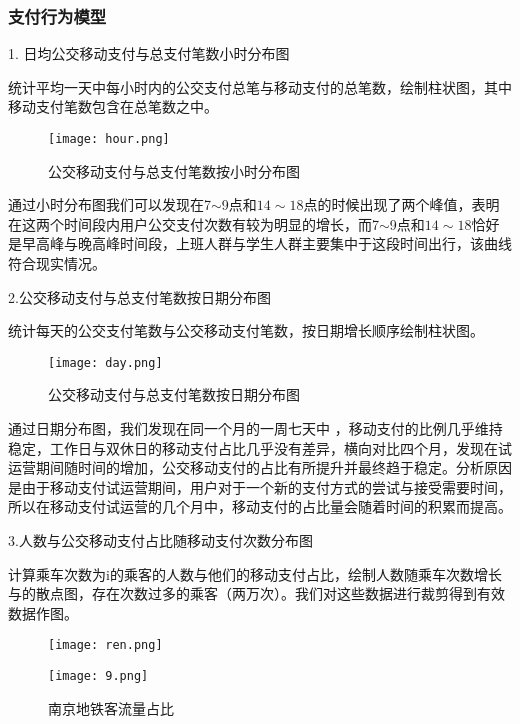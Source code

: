 \documentclass[withoutpreface,bwprint]{cumcmthesis} %
\begin{document}





\subsubsection{支付行为模型}

1. 日均公交移动支付与总支付笔数小时分布图

统计平均一天中每小时内的公交支付总笔与移动支付的总笔数，绘制柱状图，其中移动支付笔数包含在总笔数之中。
\begin{figure}[h]
\texttt{[image: hour.png]}
\caption{公交移动支付与总支付笔数按小时分布图}
\end{figure}

通过小时分布图我们可以发现在7$\sim$9点和$14\sim18$点的时候出现了两个峰值，表明在这两个时间段内用户公交支付次数有较为明显的增长，而7$\sim$9点和$14\sim18$恰好是早高峰与晚高峰时间段，上班人群与学生人群主要集中于这段时间出行，该曲线符合现实情况。

2.公交移动支付与总支付笔数按日期分布图

统计每天的公交支付笔数与公交移动支付笔数，按日期增长顺序绘制柱状图。
\begin{figure}[h]
\texttt{[image: day.png]}
\caption{公交移动支付与总支付笔数按日期分布图}
\end{figure}

通过日期分布图，我们发现在同一个月的一周七天中 ，移动支付的比例几乎维持稳定，工作日与双休日的移动支付占比几乎没有差异，横向对比四个月，发现在试运营期间随时间的增加，公交移动支付的占比有所提升并最终趋于稳定。分析原因是由于移动支付试运营期间，用户对于一个新的支付方式的尝试与接受需要时间，所以在移动支付试运营的几个月中，移动支付的占比量会随着时间的积累而提高。

3.人数与公交移动支付占比随移动支付次数分布图

计算乘车次数为i的乘客的人数与他们的移动支付占比，绘制人数随乘车次数增长与的散点图，存在次数过多的乘客（两万次）。我们对这些数据进行裁剪得到有效数据作图。

\begin{figure}[h]
\centering
\begin{minipage}[c]{0.4\textwidth}
\centering
\texttt{[image: ren.png]}
\end{minipage}
\begin{minipage}[c]{0.4\textwidth}
\centering
\texttt{[image: 9.png]}
\end{minipage}
\caption{南京地铁客流量占比}
\end{figure}
\end{document}
